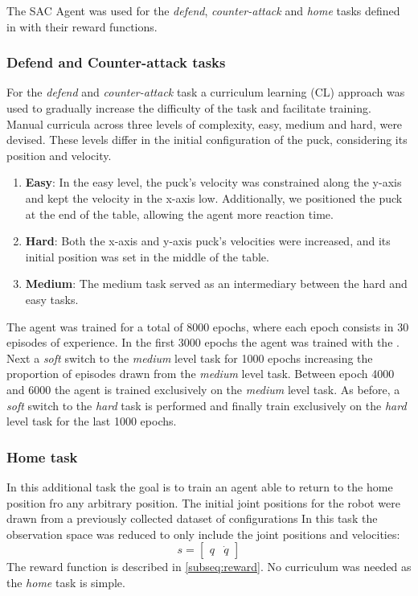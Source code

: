 The SAC Agent was used for the \textit{defend}, \textit{counter-attack} and \textit{home} tasks defined in \label{subseq:reward} with their reward functions.

\subsubsection{Defend and Counter-attack tasks}
For the \textit{defend} and \textit{counter-attack} task a curriculum learning (CL) \cite{CL} approach was used to gradually increase the difficulty of the task and facilitate training.
Manual curricula across three levels of complexity, easy, medium and hard, were devised. These levels differ in the initial configuration of the puck, considering its position and velocity.

\begin{enumerate}
    \item \textbf{Easy}: In the easy level, the puck's velocity was constrained along the y-axis and kept the velocity in the x-axis low.
    Additionally, we positioned the puck at the end of the table, allowing the agent more reaction time.
    \item \textbf{Hard}: Both the x-axis and y-axis puck's velocities were increased, and its initial position was set in the middle of the table.
    \item \textbf{Medium}: The medium task served as an intermediary between the hard and easy tasks.
\end{enumerate}

The agent was trained for a total of 8000 epochs, where each epoch consists in 30 episodes of experience. In the first 3000 epochs the agent was trained with the . Next a
\textit{soft} switch to the \textit{medium} level task for 1000 epochs increasing the proportion of episodes drawn from the \textit{medium} level task. Between epoch 4000 and 6000 the agent is trained
exclusively on the \textit{medium} level task. As before, a \textit{soft} switch to the \textit{hard} task is performed and finally train exclusively on the \textit{hard} level task for the last 1000 epochs.

\subsubsection{Home task}
In this additional task the goal is to train an agent able to return to the home position fro any arbitrary position.
The initial joint positions for the robot were drawn from a previously collected dataset of configurations 
In this  task the observation space was reduced to only include the joint positions and velocities:
\begin{equation*}
    s = \begin{bmatrix} q & \dot{q} \end{bmatrix}
\end{equation*}
The reward function is described in \ref{subseq:reward}.
No curriculum was needed as the \textit{home} task is simple.
